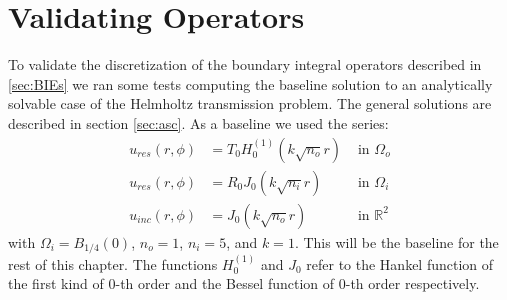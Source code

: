 \documentclass[a4paper, oneside]{discothesis}
\begin{document}
\section{Validating Operators}
To validate the discretization of the boundary integral operators described in \ref{sec:BIEs} we ran some tests computing the baseline solution to an analytically solvable case of the Helmholtz transmission problem.
The general solutions are described in section \ref{sec:asc}.
As a baseline we used the series:
\begin{align}
	u_{res}(r,\phi) &=  T_0 H_0^{(1)}(k\sqrt{n_o}r) &\text{ in } \Omega_o \\
	u_{res}(r,\phi) &=  R_0 J_0(k\sqrt{n_i}r) &\text{ in } \Omega_i \\
	u_{inc}(r,\phi) &=  J_0(k\sqrt{n_o}r) &\text{ in } \mathbb{R}^2
\end{align}
with $\Omega_i=B_{1/4}(0)$, $n_o=1$, $n_i=5$, and $k=1$.
This will be the baseline for the rest of this chapter.
The functions $H_0^{(1)}$ and $J_0$ refer to the Hankel function of the first kind of $0$-th order and the Bessel function of $0$-th order respectively. 
\end{document}
